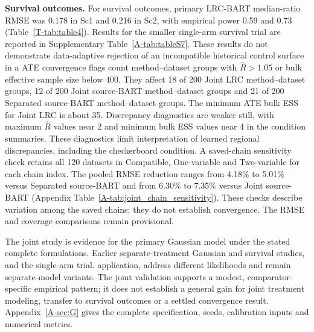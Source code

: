 \documentclass[11pt]{article}
\newcommand{\lrc}{LRC-BART} %
\theoremstyle{remark}\newtheorem{remark}{Remark}[section]
\providecommand{\DIFaddtex}[1]{{\protect\color{blue} \sf #1}} %
\providecommand{\DIFdeltex}[1]{{\protect\color{red} \scriptsize #1}} %
\providecommand{\DIFaddbegin}{} %
\providecommand{\DIFaddend}{} %
\providecommand{\DIFdelbegin}{} %
\providecommand{\DIFdelend}{} %
\providecommand{\DIFadd}[1]{\texorpdfstring{\DIFaddtex{#1}}{#1}} %
\providecommand{\DIFdel}[1]{\texorpdfstring{\DIFdeltex{#1}}{}} %
\begin{document}
\DIFdelbegin %
\DIFdel{\textbf{Survival outcomes.}
For survival outcomes, primary \lrc{} median-ratio RMSE was 0.178 in Sc1 and 0.216 in Sc2, with empirical power 0.59 and 0.73 (Table~\ref{T-tab:table4}). Results for the smaller single-arm survival trial are reported in Supplementary Table~\ref{A-tab:tableS7}. These results do not demonstrate data-adaptive rejection of an incompatible historical control surface in a }\DIFdelend \DIFaddbegin \DIFadd{ATE convergence flags count method--dataset groups with $\widehat R>1.05$ or bulk effective sample size below 400. They affect 18 of 200 Joint LRC method--dataset groups, 12 of 200 Joint source-BART method--dataset groups and 21 of 200 Separated source-BART method--dataset groups. The minimum ATE bulk ESS for Joint LRC is about 35. Discrepancy diagnostics are weaker still, with maximum $\widehat R$ values near 2 and minimum bulk ESS values near 4 in the condition summaries. These diagnostics limit interpretation of learned regional discrepancies, including the checkerboard condition. A saved-chain sensitivity check retains all 120 datasets in Compatible, One-variable and Two-variable for each chain index. The pooled RMSE reduction ranges from 4.18\% to 5.01\% versus Separated source-BART and from 6.30\% to 7.35\% versus Joint source-BART (Appendix Table~\ref{A-tab:joint_chain_sensitivity}). These checks describe variation among the saved chains; they do not establish convergence. The RMSE and coverage comparisons remain provisional.
}

\DIFadd{The joint study is evidence for the primary Gaussian model under the stated complete formulations. Earlier separate-treatment Gaussian and survival studies, and the }\DIFaddend single-arm \DIFdelbegin \DIFdel{trial. }\DIFdelend \DIFaddbegin \DIFadd{application, address different likelihoods and remain separate-model variants. The joint validation supports a modest, comparator-specific empirical pattern; it does not establish a general gain for joint treatment modeling, transfer to survival outcomes or a settled convergence result. Appendix~\ref{A-sec:G} gives the complete specification, seeds, calibration inputs and numerical metrics.
 }\DIFaddend 
\end{document}
